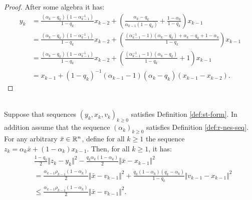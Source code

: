 \documentclass[12pt]{article}
\begin{document}
\begin{proof}
            After some algebra it has: 
            \begin{align*}
                y_k &= 
                \frac{(\alpha_k - q_k)(1 - \alpha_{k - 1}^{-1})}{1 - q_k}x_{k - 2} 
                + \left(
                    \frac{\alpha_k - q_k}{\alpha_{k - 1}(1 - q_k)} + \frac{1 - \alpha_k}{1 - q_k}
                \right)x_{k - 1}
                \\
                &= 
                \frac{(\alpha_k - q_k)(1 - \alpha_{k - 1}^{-1})}{1 - q_k}x_{k - 2} 
                + \left(
                    \frac{
                        (\alpha_{k - 1}^{-1} -1)(\alpha_k - q_k)
                        + \alpha_k - q_k + 1 - \alpha_k
                    }{1 - q_k}
                \right)x_{k - 1}
                \\
                &= \frac{(\alpha_k - q_k)(1 - \alpha_{k - 1}^{-1})}{1 - q_k}x_{k - 2} 
                + \left(
                    \frac{
                        (\alpha_{k - 1}^{-1} -1)(\alpha_k - q_k)
                    }{1 - q_k} + 1
                \right)x_{k - 1}
                \\
                &= x_{k -1} + (1 - q_k)^{-1}(\alpha_{k - 1} - 1)(\alpha_k - q_k)(x_{k - 1} - x_{k - 2}). 
            \end{align*}
        \end{proof}
        \begin{lemma}\;\label{lemma:cnvg-prep-part2}\\
            Suppose that sequences $(y_k, x_k, v_k)_{k \ge 0}$ satisfies Definition \ref{def:st-form}. 
            In addition assume that the sequence $(\alpha_k)_{k \ge 0}$ satisfies Definition \ref{def:r-nes-seq}. 
            For any arbitrary $\bar x \in \mathbb R^n$, define for all $k \ge 1$ the sequence $z_k = \alpha_k \bar x + (1 - \alpha_k) x_{k - 1}$. 
            Then, for all $k \ge 1$, it has:
            \begin{align*}
                & \frac{1 - q_k}{2}\Vert z_k - y_k\Vert^2
                - \frac{q_k\alpha_k(1 - \alpha_k)}{2}\Vert \bar x - x_{k - 1}\Vert^2
                \\
                &= 
                \frac{\alpha_{k - 1}\rho_{k - 1}(1 - \alpha_k)}{2}\Vert \bar x - v_{k - 1}\Vert^2
                + \frac{q_k(1 - \alpha_k)(q_k - \alpha_k)}{1 - q_k}\Vert v_{k - 1} - x_{k - 1}\Vert^2
                \\
                &\le 
                \frac{\alpha_{k - 1}\rho_{k - 1}(1 - \alpha_k)}{2}\Vert \bar x - v_{k - 1}\Vert^2. 
            \end{align*}
        \end{lemma}
\end{document}
